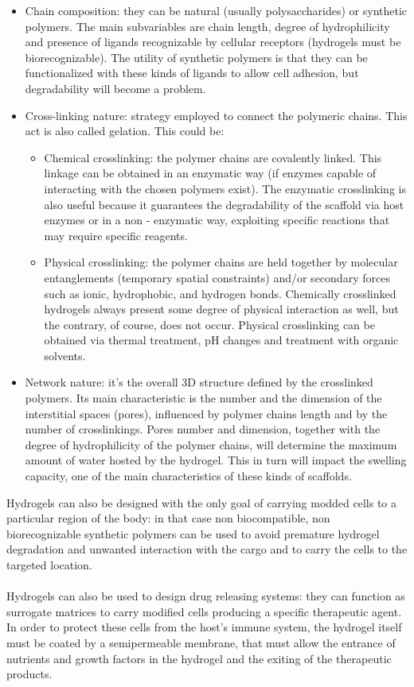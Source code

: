 \begin{itemize}
\item Chain composition: they can be natural (usually polysaccharides) or synthetic polymers. The main subvariables are chain length, degree of hydrophilicity and presence of ligands recognizable by cellular receptors (hydrogels must be biorecognizable). The utility of synthetic polymers is that they can be functionalized with these kinds of ligands to allow cell adhesion, but degradability will become a problem.
\item Cross-linking nature: strategy employed to connect the polymeric chains. This act is also called gelation. This could be:
	\begin{itemize}
	\item Chemical crosslinking: the polymer chains are covalently linked.
This linkage can be obtained in an enzymatic way (if enzymes capable of interacting with the chosen polymers exist).
The enzymatic crosslinking is also useful because it guarantees the degradability of the scaffold via host enzymes or in a non - enzymatic way, exploiting specific reactions that may require specific reagents.
	\item Physical crosslinking: the polymer chains are held together by molecular entanglements (temporary spatial constraints) and/or secondary forces such as ionic, hydrophobic, and hydrogen bonds. Chemically crosslinked hydrogels always present some degree of physical interaction as well, but the contrary, of course, does not occur.
Physical crosslinking can be obtained via thermal treatment, pH changes and treatment with organic solvents.
	\end{itemize}
\item Network nature: it’s the overall 3D structure defined by the crosslinked polymers.
Its main characteristic is the number and the dimension of the interstitial spaces (pores), influenced by polymer chains length and by the number of crosslinkings.
Pores number and dimension, together with the degree of hydrophilicity of the polymer chains, will determine the maximum amount of water hosted by the hydrogel.
This in turn will impact the swelling capacity, one of the main characteristics of these kinds of scaffolds.
\end{itemize}
\noindent
Hydrogels can also be designed with the only goal of carrying modded cells to a particular region of the body: in that case non biocompatible, non biorecognizable synthetic polymers can be used to avoid premature hydrogel degradation and unwanted interaction with the cargo and to carry the cells to the targeted location.
\\
\\
\noindent
Hydrogels can also be used to design drug releasing systems: they can function as surrogate matrices to carry modified cells producing a specific therapeutic agent.
In order to protect these cells from the host’s immune system, the hydrogel itself must be coated by a semipermeable membrane, that must allow the entrance of nutrients and growth factors in the hydrogel and the exiting of the therapeutic products.
